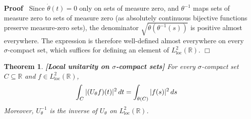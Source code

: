 \documentclass{article}
\newcommand{\tmop}[1]{\ensuremath{\operatorname{#1}}}
\newcommand{\tmstrong}[1]{\textbf{#1}}
\newenvironment{proof}{\noindent\textbf{Proof\ }}{\hspace*{\fill}$\Box$\medskip}
\newtheorem{theorem}{Theorem}
\begin{document}
\begin{proof}
  Since $\dot{\theta} (t) = 0$ only on sets of measure zero, and $\theta^{-
  1}$ maps sets of measure zero to sets of measure zero (as absolutely
  continuous bijective functions preserve measure-zero sets), the denominator
  $\sqrt{\dot{\theta} (\theta^{- 1} (s))}$ is positive almost everywhere. The
  expression is therefore well-defined almost everywhere on every
  $\sigma$-compact set, which suffices for defining an element of
  $L^2_{\tmop{loc}} (\mathbb{R})$.
\end{proof}

\begin{theorem}
  {\tmstrong{[Local unitarity on $\sigma$-compact
  sets]\label{thm:local_unitarity}}} For every $\sigma$-compact set $C
  \subseteq \mathbb{R}$ and $f \in L^2_{\tmop{loc}} (\mathbb{R})$,
  \begin{equation}
    \int_C | (U_{\theta} f) (t) |^2 \hspace{0.17em} dt = \int_{\theta (C)} |f
    (s) |^2  \hspace{0.17em} ds
  \end{equation}
  Moreover, $U_{\theta}^{- 1}$ is the inverse of $U_{\theta}$ on
  $L^2_{\tmop{loc}} (\mathbb{R})$.
\end{theorem}
\end{document}
